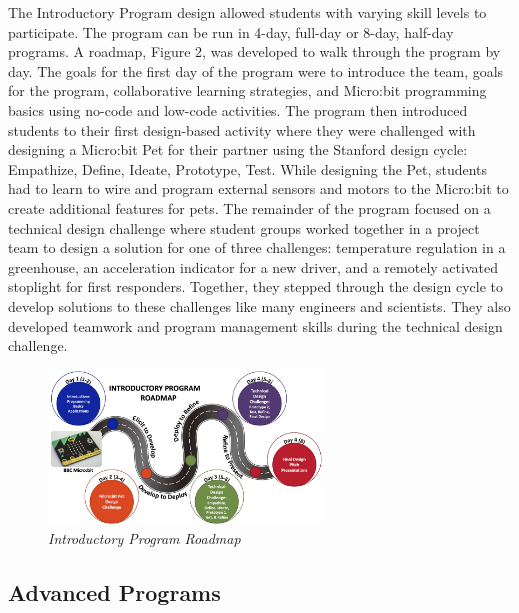 \documentclass[
]{article}
\begin{document}
The Introductory Program design allowed students with varying skill
levels to participate. The program can be run in 4-day, full-day or
8-day, half-day programs. A roadmap, Figure 2, was developed to walk
through the program by day. The goals for the first day of the program
were to introduce the team, goals for the program, collaborative
learning strategies, and Micro:bit programming basics using no-code and
low-code activities. The program then introduced students to their first
design-based activity where they were challenged with designing a
Micro:bit Pet for their partner using the Stanford design cycle:
Empathize, Define, Ideate, Prototype, Test. While designing the Pet,
students had to learn to wire and program external sensors and motors to
the Micro:bit to create additional features for pets. The remainder of
the program focused on a technical design challenge where student groups
worked together in a project team to design a solution for one of three
challenges: temperature regulation in a greenhouse, an acceleration
indicator for a new driver, and a remotely activated stoplight for first
responders. Together, they stepped through the design cycle to develop
solutions to these challenges like many engineers and scientists. They
also developed teamwork and program management skills during the
technical design challenge.

\begin{figure}
\centering
\includegraphics[width=0.65\textwidth,height=\textheight]{Images/GGEE_23_intro_roadmap.jpg}
\caption{\emph{Introductory Program Roadmap}}
\end{figure}

\hypertarget{advanced-programs}{%
\subsection{Advanced Programs}\label{advanced-programs}}
\end{document}
